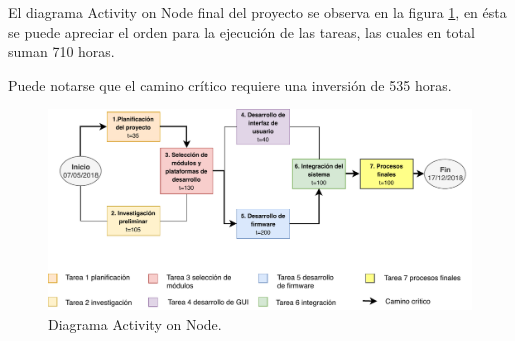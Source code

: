 El diagrama Activity on Node final del proyecto se observa en la figura \ref{fig:none}, en ésta se puede apreciar el orden para la ejecución de las tareas, las cuales en total suman 710 horas.

Puede notarse que el camino crítico requiere una inversión de 535 horas.

\begin{figure}[h]
	\centering
	\includegraphics[scale=.8]{./Figures/none.pdf}
	\caption{Diagrama Activity on Node.}
	\label{fig:none}
\end{figure}






